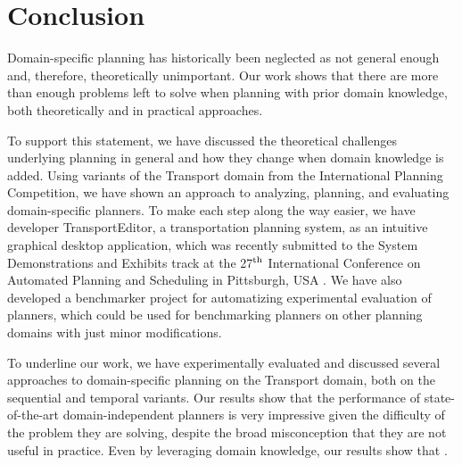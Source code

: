 \chapter*{Conclusion}

Domain-specific planning has historically been neglected as not general enough
and, therefore, theoretically unimportant.
Our work shows that there are more than enough problems
left to solve when planning with prior domain knowledge,
both theoretically and in practical approaches.

To support this statement,
we have discussed the theoretical challenges underlying
planning in general and how they change when
domain knowledge is added.
Using variants of the Transport domain from the International Planning Competition,
we have shown an approach to analyzing,
planning, and evaluating domain-specific planners.
To make each step along the way easier, we have developer TransportEditor,
a transportation planning system, as an intuitive graphical desktop application,
which was recently submitted  to the System Demonstrations and Exhibits
track at the 27$^{\textrm{th}}$ International Conference on Automated Planning and Scheduling
in Pittsburgh, USA \citep{Skopek2017}. We have also developed a benchmarker project
for automatizing experimental evaluation of planners, which could be used for benchmarking planners on
other planning domains with just minor modifications.

To underline our work, we have experimentally evaluated and discussed several approaches to
domain-specific planning on the Transport domain, both on the sequential and temporal
variants.
Our results show that the performance of state-of-the-art domain-independent planners is very impressive given the difficulty of the problem they are solving, despite the broad misconception that they are not useful in practice.
Even by leveraging domain knowledge, our results show that .

